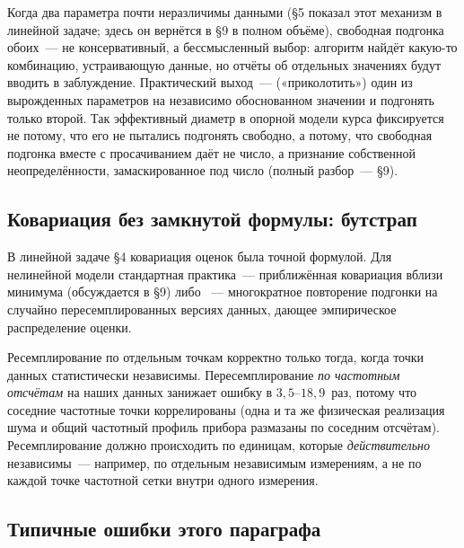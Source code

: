 Когда два параметра почти неразличимы данными (§5 показал этот механизм в линейной задаче;
здесь он вернётся в §9 в полном объёме), свободная подгонка обоих~--- не консервативный, а
бессмысленный выбор: алгоритм найдёт какую-то комбинацию, устраивающую данные, но отчёты об
отдельных значениях будут вводить в заблуждение. Практический выход~--- 
(«приколотить») один из вырожденных параметров на независимо обоснованном значении и подгонять
только второй. Так эффективный диаметр в опорной модели курса фиксируется не потому, что его
не пытались подгонять свободно, а потому, что свободная подгонка вместе с просачиванием даёт
не число, а признание собственной неопределённости, замаскированное под число (полный разбор~---
§9).

\subsection{Ковариация без замкнутой формулы: бутстрап}
\label{subsec:bootstrap}

В линейной задаче §4 ковариация оценок была точной формулой. Для нелинейной модели стандартная
практика~--- приближённая ковариация вблизи минимума (обсуждается в §9) либо
~--- многократное повторение подгонки на случайно пересемплированных версиях
данных, дающее эмпирическое распределение оценки.

\begin{warning}
Ресемплирование по отдельным точкам корректно только тогда, когда точки данных статистически
независимы. Пересемплирование \emph{по частотным отсчётам} на наших данных занижает ошибку в
$3{,}5$--$18{,}9$~раз, потому что соседние частотные точки коррелированы (одна и та же
физическая реализация шума и общий частотный профиль прибора размазаны по соседним отсчётам).
Ресемплирование должно происходить по единицам, которые \emph{действительно} независимы~---
например, по отдельным независимым измерениям, а не по каждой точке частотной сетки внутри
одного измерения.
\end{warning}

\subsection{Типичные ошибки этого параграфа}

